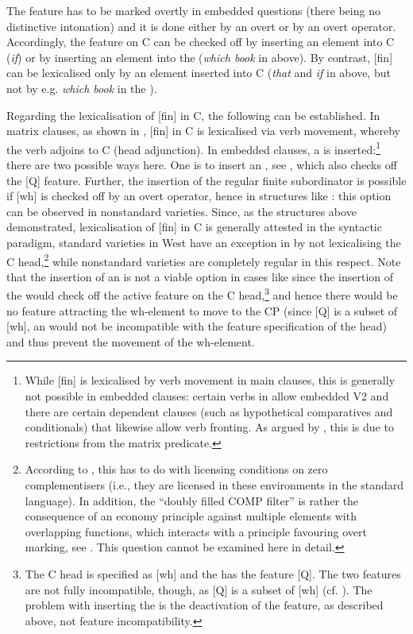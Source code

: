 \documentclass[output=paper,modfonts, hidelinks, newtxmath]{langscibook}
\begin{document}
\noindent The  feature has to be marked overtly in embedded questions (there being no distinctive  intonation) and it is done either by an overt  or by an overt operator. Accordingly, the  feature on C can be checked off by inserting an element into C (\textit{if}) or by inserting an element into the  (\textit{which book} in  above). By contrast, [fin] can be lexicalised only by an element inserted into C (\textit{that} and \textit{if} in  above, but not by e.g. \textit{which book} in the ).

Regarding the lexicalisation of [fin] in C, the following can be established. In matrix clauses, as shown in , [fin] in C is lexicalised via verb movement, whereby the verb adjoins to C (head adjunction). In embedded clauses, a  is inserted:\footnote{While [fin] is lexicalised by verb movement in main clauses, this is generally not possible in embedded clauses: certain verbs in  allow embedded V2 and there are certain dependent clauses (such as hypothetical comparatives and conditionals) that likewise allow verb fronting. As argued by \citet{bacskaiatkaritoappear}, this is due to restrictions from the matrix predicate.} there are two possible ways here. One is to insert an  , see , which also checks off the [Q] feature. Further, the insertion of the regular finite subordinator is possible if [wh] is checked off by an overt operator, hence in structures like : this option can be observed in nonstandard varieties. Since, as the structures above demonstrated, lexicalisation of [fin] in C is generally attested in the syntactic paradigm, standard varieties in West  have an exception in  by not lexicalising the C head,\footnote{According to \citet{bacskaiatkaritoappear}, this has to do with licensing conditions on zero complementisers (i.e., they are licensed in these environments in the standard language). In addition, the ``doubly filled COMP filter'' is rather the consequence of an economy principle against multiple elements with overlapping functions, which interacts with a principle favouring overt marking, see \citet{vangelderen2009}. This question cannot be examined here in detail.} while nonstandard varieties are completely regular in this respect. Note that the insertion of an   is not a viable option in cases like  since the insertion of the  would check off the active  feature on the C head,\footnote{The C head is specified as [wh] and the  has the feature [Q]. The two features are not fully incompatible, though, as [Q] is a subset of [wh] (cf. \citealt{bayer2004}). The problem with inserting the  is the deactivation of the feature, as described above, not feature incompatibility.} and hence there would be no feature attracting the wh-element to move to the CP (since [Q] is a subset of [wh], an   would not be incompatible with the feature specification of the head) and thus prevent the movement of the wh-element.
\end{document}
